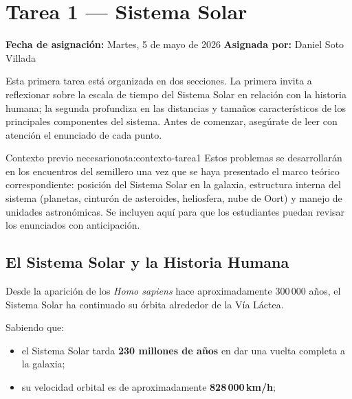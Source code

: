 \chapter{Tarea 1 — Sistema Solar}

\begin{destacado}
    \textbf{Fecha de asignación:} Martes, 5 de mayo de 2026 \quad
    \textbf{Asignada por:} Daniel Soto Villada
\end{destacado}

\medskip

Esta primera tarea está organizada en dos secciones. La primera invita a reflexionar
sobre la escala de tiempo del Sistema Solar en relación con la historia humana; la
segunda profundiza en las distancias y tamaños característicos de los principales
componentes del sistema. Antes de comenzar, asegúrate de leer con atención el
enunciado de cada punto.

\begin{nota}{Contexto previo necesario}{nota:contexto-tarea1}
    Estos problemas se desarrollarán en los encuentros del semillero una vez que se
    haya presentado el marco teórico correspondiente: posición del Sistema Solar en
    la galaxia, estructura interna del sistema (planetas, cinturón de asteroides,
    heliosfera, nube de Oort) y manejo de unidades astronómicas. Se incluyen aquí
    para que los estudiantes puedan revisar los enunciados con anticipación.
\end{nota}

\section{El Sistema Solar y la Historia Humana}

Desde la aparición de los \textit{Homo sapiens} hace aproximadamente 300\,000 años,
el Sistema Solar ha continuado su órbita alrededor de la Vía Láctea.

Sabiendo que:
\begin{itemize}[leftmargin=1.5em]
    \item el Sistema Solar tarda \textbf{230 millones de años} en dar una vuelta
          completa a la galaxia;
    \item su velocidad orbital es de aproximadamente \textbf{828\,000\,km/h};
\end{itemize}

